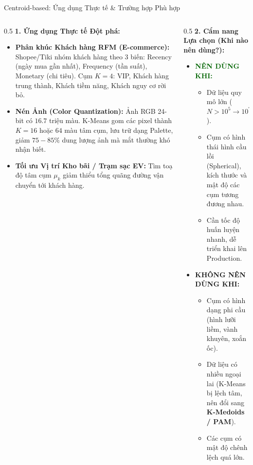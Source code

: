 \documentclass[aspectratio=169,10pt]{beamer}
\begin{document}
\begin{frame}{Centroid-based: Ứng dụng Thực tế \& Trường hợp Phù hợp}
  \small
  \begin{columns}[T]
    \begin{column}{0.5\textwidth}
      \textbf{1. Ứng dụng Thực tế Đột phá:}
      \begin{itemize}\setlength{\itemsep}{2pt}
        \item \textbf{Phân khúc Khách hàng RFM (E-commerce):}
          Shopee/Tiki nhóm khách hàng theo 3 biến: Recency (ngày mua gần nhất), Frequency (tần suất), Monetary (chi tiêu). Cụm $K=4$: VIP, Khách hàng trung thành, Khách tiềm năng, Khách nguy cơ rời bỏ.
        \item \textbf{Nén Ảnh (Color Quantization):}
          Ảnh RGB 24-bit có $16.7$ triệu màu. K-Means gom các pixel thành $K=16$ hoặc $64$ màu tâm cụm, lưu trữ dạng Palette, giảm $75-85\%$ dung lượng ảnh mà mắt thường khó nhận biết.
        \item \textbf{Tối ưu Vị trí Kho bãi / Trạm sạc EV:}
          Tìm toạ độ tâm cụm $\mu_k$ giảm thiểu tổng quãng đường vận chuyển tới khách hàng.
      \end{itemize}
    \end{column}
    \begin{column}{0.5\textwidth}
      \textbf{2. Cẩm nang Lựa chọn (Khi nào nên dùng?):}
      \begin{itemize}\setlength{\itemsep}{2pt}
        \item \textcolor{darkgreen}{\textbf{NÊN DÙNG KHI:}}
          \begin{itemize}
            \item Dữ liệu quy mô lớn ($N > 10^5 \to 10^7$).
            \item Cụm có hình thái hình cầu lồi (Spherical), kích thước và mật độ các cụm tương đương nhau.
            \item Cần tốc độ huấn luyện nhanh, dễ triển khai lên Production.
          \end{itemize}
        \item \textcolor{crimsonred}{\textbf{KHÔNG NÊN DÙNG KHI:}}
          \begin{itemize}
            \item Cụm có hình dạng phi cầu (hình lưỡi liềm, vành khuyên, xoắn ốc).
            \item Dữ liệu có nhiều ngoại lai (K-Means bị lệch tâm, nên đổi sang \textbf{K-Medoids / PAM}).
            \item Các cụm có mật độ chênh lệch quá lớn.
          \end{itemize}
      \end{itemize}
    \end{column}
  \end{columns}
\end{frame}
\end{document}
